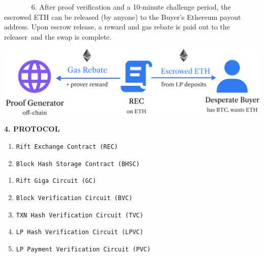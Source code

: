 \documentclass[
]{article}
\newcommand{\code}[1]{\texttt{#1}}
\providecommand{\tightlist}{%
  \setlength{\itemsep}{0pt}\setlength{\parskip}{0pt}}
\begin{document}
{}

{}

{~ ~ ~ ~ ~6. After proof verification and a 10-minute challenge
period, the escrowed ETH can be released (by anyone) to the Buyer's
Ethereum payout address. Upon escrow release, a reward and gas rebate is
paid out to the releaser}{~and the swap is complete.}

{\includegraphics{images/image2.png}}
{}\vspace*{\baselineskip}


\begin{center}
\textbf{4. PROTOCOL}
\end{center}
{}\vspace*{\baselineskip}
{}

\hspace*{3em}{The protocol consists of 2 smart contracts and 5 zk-circuits. The
main components and their functionality are outlined below:}

{}

\hspace*{3em}{Smart Contracts:}

{}
\addtolength{\leftmargini}{0.6cm} %
\begin{enumerate}
\tightlist
\item \code{Rift Exchange Contract (REC)}
\item \code{Block Hash Storage Contract (BHSC)}
\end{enumerate}

{}

\hspace*{3em}{Zero-Knowledge Circuits:}

{}

\begin{enumerate}
\tightlist
\item \code  {Rift Giga Circuit (GC)}
\item \code  {Block Verification Circuit (BVC) }
\item \code  {TXN Hash Verification Circuit (TVC)}
\item \code  {LP Hash Verification Circuit (LPVC)}
\item \code  {LP Payment Verification Circuit (PVC)}
\end{enumerate}
\end{document}
